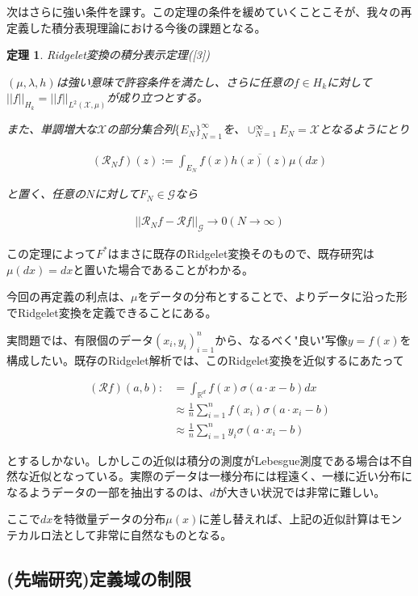 \documentclass{jsarticle}
\newtheorem{theo}{定理}[section]
\begin{document}
次はさらに強い条件を課す。この定理の条件を緩めていくことこそが、我々の再定義した積分表現理論における今後の課題となる。

\begin{theo} Ridgelet変換の積分表示定理([3])

$(\mu,\lambda,h)$は強い意味で許容条件を満たし、さらに任意の$f\in H_k$に対して$||f||_{H_k}=||f||_{L^2(\mathcal{X},\mu)}$が成り立つとする。

また、単調増大な$\mathcal{X}$の部分集合列$\{E_N\}^\infty_{N=1}$を、$\cup^\infty_{N=1} E_N=\mathcal{X}$となるようにとり

\begin{align}
(\mathcal{R}_Nf)(z):=\int_{E_N} f(x) \overline{h(x)(z)}\mu(dx)
\end{align}

と置く、任意の$N$に対して$F_N\in\mathcal{G}$なら

\begin{align}
||\mathcal{R}_Nf-\mathcal{R}f||_\mathcal{G}\to 0(N\to\infty) 
\end{align}
\end{theo}

この定理によって$F^*$はまさに既存のRidgelet変換そのもので、既存研究は$\mu(dx)=dx$と置いた場合であることがわかる。

今回の再定義の利点は、$\mu$をデータの分布とすることで、よりデータに沿った形でRidgelet変換を定義できることにある。

実問題では、有限個のデータ$(x_i,y_i)^n_{i=1}$から、なるべく"良い"写像$y=f(x)$を構成したい。既存のRidgelet解析では、このRidgelet変換を近似するにあたって

\begin{align}
(\mathcal{R} f)(a,b):&=\int_{\mathbb{R}^d} f(x)\sigma(a\cdot x-b)dx\\
&\approx \frac{1}{n}\sum^n_{i=1} f(x_i)\sigma(a\cdot x_i-b)\\
&\approx \frac{1}{n}\sum^n_{i=1} y_i\sigma(a\cdot x_i-b)
\end{align}

とするしかない。しかしこの近似は積分の測度がLebesgue測度である場合は不自然な近似となっている。実際のデータは一様分布には程遠く、一様に近い分布になるようデータの一部を抽出するのは、$d$が大きい状況では非常に難しい。

ここで$dx$を特徴量データの分布$\mu(x)$に差し替えれば、上記の近似計算はモンテカルロ法として非常に自然なものとなる。



\subsection{(先端研究)定義域の制限}
\end{document}
